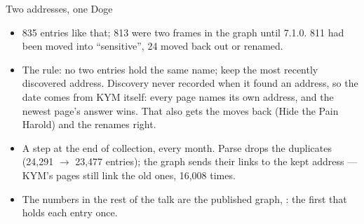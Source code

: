 \begin{frame}{Two addresses, one Doge}
{\begin{itemize}
      its ``sensitive'' section, \texttt{/sensitive/memes/doge} --- and the old address still opens.
      Discovery keeps every address it ever found, so we had both, each parsed, linked and drawn.
    \item 835 entries like that; 813 were two frames in the graph until 7.1.0. 811 had been moved
      into ``sensitive'', 24 moved back out or renamed.
    \item The rule: no two entries hold the same name; keep the most recently discovered address.
      Discovery never recorded when it found an address, so the date comes from KYM itself: every
      page names its own address, and the newest page's answer wins. That also gets the moves back
      (Hide the Pain Harold) and the renames right.
    \item A step at the end of collection, every month. Parse drops the duplicates (24,291 $\to$
      23,477 entries); the graph sends their links to the kept address --- KYM's pages still link
      the old ones, 16,008 times.
    \item The numbers in the rest of the talk are the published graph, \NVersion: the first that
      holds each entry once.
  \end{itemize}}
\end{frame}

